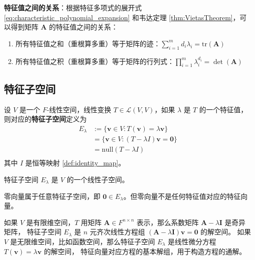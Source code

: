 \vspace{0.5em}

\textbf{特征值之间的关系}：根据特征多项式的展开式 \ref{eq:characteristic_polynomial_expansion} 和韦达定理 \ref{thm:VietasTheorem}，可以得到矩阵 $\mathbf{A}$ 的特征值之间的关系：
\begin{enumerate}
    \item 所有特征值之和（重根算多重）等于矩阵的迹：$\sum_{i=1}^{m} d_i \lambda_i = \mathrm{tr}(\mathbf{A})$
    \item 所有特征值之积（重根算多重）等于矩阵的行列式：$\prod_{i=1}^{m} \lambda_i^{d_i} = \det(\mathbf{A})$
\end{enumerate}

\vspace{1em}

\subsection{特征子空间}

\begin{definition}
    设 $V$ 是一个 $F$-线性空间，线性变换 $T\in \mathcal{L}(V,V)$，如果 $\lambda$ 是 $T$ 的一个特征值，则对应的\textbf{特征子空间}定义为
    \begin{align*}
        E_\lambda &:= \{\mathbf{v}\in V : T(\mathbf{v}) = \lambda \mathbf{v}\}\\
        &= \{\mathbf{v}\in V : (T - \lambda I) \mathbf{v}= \mathbf{0}\}\\
        &=\mathrm{null}(T - \lambda I)\\
    \end{align*}
    其中 $I$ 是恒等映射 \ref{def:identity_map}。
    \label{def:eigenspace}
\end{definition}

\begin{proposition}
    特征子空间 $E_\lambda$ 是 $V$ 的一个线性子空间。
\end{proposition}

\begin{corollary}
    零向量属于任意特征子空间，即 $\mathbf{0}\in E_\lambda$。但零向量不是任何特征值对应的特征向量。
\end{corollary}

\begin{note}
    如果 $V$ 是有限维空间，$T$ 用矩阵 $\mathbf{A}\in F^{n\times n}$ 表示，那么系数矩阵 $\mathbf{A} - \lambda \mathbf{I}$ 是奇异矩阵，
    特征子空间 $E_\lambda$ 是 $n$ 元齐次线性方程组 $(\mathbf{A} - \lambda \mathbf{I})\mathbf{v} = \mathbf{0}$ 的解空间。
    如果 $V$ 是无限维空间，比如函数空间，那么特征子空间 $E_\lambda$ 是线性微分方程 $T(\mathbf{v}) = \lambda \mathbf{v}$ 的解空间，
    特征向量对应方程的基本解组，用于构造方程的通解。
\end{note}
\vspace{1em}

